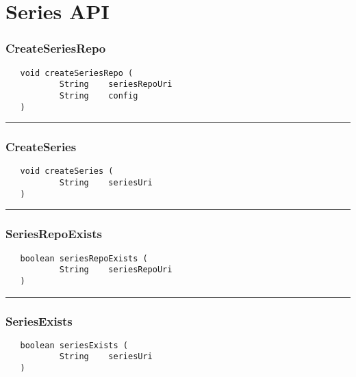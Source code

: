 \chapter{Series API}

\subsection{CreateSeriesRepo}
\label{Api:CreateSeriesRepo}
\begin{verbatim}
   void createSeriesRepo (
           String    seriesRepoUri
           String    config
   )
\end{verbatim}



\rule{15cm}{2pt}
\subsection{CreateSeries}
\label{Api:CreateSeries}
\begin{verbatim}
   void createSeries (
           String    seriesUri
   )
\end{verbatim}



\rule{15cm}{2pt}
\subsection{SeriesRepoExists}
\label{Api:SeriesRepoExists}
\begin{verbatim}
   boolean seriesRepoExists (
           String    seriesRepoUri
   )
\end{verbatim}



\rule{15cm}{2pt}
\subsection{SeriesExists}
\label{Api:SeriesExists}
\begin{verbatim}
   boolean seriesExists (
           String    seriesUri
   )
\end{verbatim}



